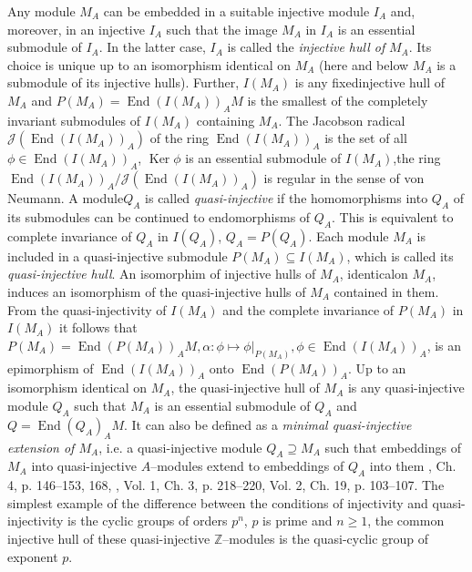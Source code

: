 \documentclass[a4paper,11pt]{article}
\DeclareMathOperator{\Ker}{Ker}
\DeclareMathOperator{\End}{End}
\begin{document}
Any module $M_A$ can be embedded in a suitable injective module $I_A$ and, 
moreover, in an injective $I_A$ such that the image $M_A$ in $I_A$ is an 
essential submodule of $I_A$. In the latter case, $I_A$ is called the 
\emph{injective hull of} $M_A$. Its choice is unique up to an isomorphism 
identical on $M_A$ (here and below $M_A$ is a submodule of its injective 
hulls). Further, $I(M_A)$ is any fixed\linebreak injective hull of $M_A$ and 
${P(M_A)=\End(I(M_A))_A M}$ is the smallest of the completely invariant 
submodules of $I(M_A)$ containing $M_A$. The Jacobson radical 
$\mathcal{J}(\End(I(M_A))_A)$ of the ring $\End(I(M_A))_A$ is the set of 
all ${\phi\in \End(I(M_A))_A}$, $\Ker \phi$ is an essential submodule of 
$I(M_A)$,\linebreak the ring $\End(I(M_A))_A/\mathcal{J}(\End(I(M_A))_A)$ is regular 
in the sense of von Neumann. A module\linebreak $Q_A$ is called \emph{quasi-injective} if 
the homomorphisms into $Q_A$ of its submodules can be continued to 
endomorphisms of $Q_A$. This is equivalent to complete invariance of $Q_A$ in 
$I(Q_A)$, ${Q_A=P(Q_A)}$. Each module $M_A$ is included in a quasi-injective 
submodule ${P(M_A)\subseteq I(M_A)}$, which is called its 
\emph{quasi-injective hull}. An isomorphim of injective hulls of $M_A$, 
identical\linebreak on $M_A$, induces an isomorphism of the quasi-injective hulls of 
$M_A$ contained in them. From the quasi-injectivity of $I(M_A)$ and the 
complete invariance of $P(M_A)$ in $I(M_A)$ it follows that 
${P(M_A)=\End(P(M_A))_A M, \alpha: \phi\longmapsto \phi|_{P(M_A)}, 
\phi\in \End(I(M_A))_A}$, is an epimorphism of $\End(I(M_A))_A$ onto 
$\End(P(M_A))_A$. Up to an isomorphism identical on $M_A$, the quasi-injec\-tive 
hull of $M_A$ is any quasi-injective module $Q_A$ such that $M_A$ is an 
essential submodule of $Q_A$ and ${Q=\End(Q_A)_A M}$. It can also be defined as 
a \emph{minimal quasi-injective extension of $M_A$}, i.e. a quasi-injective 
module ${Q_A\supseteq M_A}$ such that embeddings of $M_A$ into quasi-injective 
$A$--modules extend to embeddings of $Q_A$ into them \cite{Lamb}, Ch. 4, 
p. 146--153, 168, \cite{Fe}, Vol. 1, Ch. 3, p. 218--220, Vol. 2, Ch. 19, 
p. 103--107. The simplest example of the difference between the conditions of 
injectivity and quasi-injectivity is the cyclic groups of orders $p^n$, 
$p$ is prime and ${n\geq 1}$, the common injective hull of these quasi-injective 
$\mathbb{Z}$--modules is the quasi-cyclic group of exponent $p$.  
\end{document}
